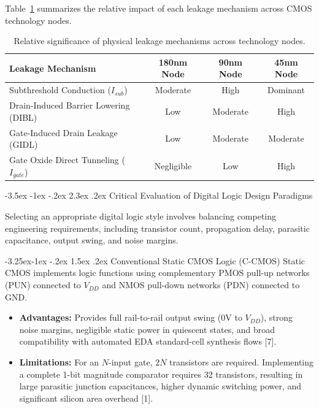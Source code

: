 \documentclass[12pt,a4paper,oneside]{report}
\makeatletter
\renewcommand\section{\@startsection {section}{1}{\z@}%
                                   {-3.5ex \@plus -1ex \@minus -.2ex}%
                                   {2.3ex \@plus.2ex}%
                                   {\normalfont\normalsize\bfseries}}
\renewcommand\subsection{\@startsection{subsection}{2}{\z@}%
                                     {-3.25ex\@plus -1ex \@minus -.2ex}%
                                     {1.5ex \@plus .2ex}%
                                     {\normalfont\normalsize\bfseries\itshape}}
\makeatother
\begin{document}
Table~\ref{tab:leakage_summary} summarizes the relative impact of each leakage mechanism across CMOS technology nodes.

\begin{table}[H]
\centering
\caption{Relative significance of physical leakage mechanisms across technology nodes.}
\label{tab:leakage_summary}
\vspace{0.2cm}
\begin{tabular}{|l|c|c|c|}
\hline
\textbf{Leakage Mechanism} & \textbf{180nm Node} & \textbf{90nm Node} & \textbf{45nm Node} \\
\hline
Subthreshold Conduction ($I_{sub}$) & Moderate & High & Dominant \\
\hline
Drain-Induced Barrier Lowering (DIBL) & Low & Moderate & High \\
\hline
Gate-Induced Drain Leakage (GIDL) & Low & Moderate & Moderate \\
\hline
Gate Oxide Direct Tunneling ($I_{gate}$) & Negligible & Low & High \\
\hline
\end{tabular}
\end{table}

\section{Critical Evaluation of Digital Logic Design Paradigms}

Selecting an appropriate digital logic style involves balancing competing engineering requirements, including transistor count, propagation delay, parasitic capacitance, output swing, and noise margins.

\subsection{Conventional Static CMOS Logic (C-CMOS)}
Static CMOS implements logic functions using complementary PMOS pull-up networks (PUN) connected to $V_{DD}$ and NMOS pull-down networks (PDN) connected to GND.
\begin{itemize}
\item \textbf{Advantages:} Provides full rail-to-rail output swing ($0\text{V}$ to $V_{DD}$), strong noise margins, negligible static power in quiescent states, and broad compatibility with automated EDA standard-cell synthesis flows [7].
\item \textbf{Limitations:} For an $N$-input gate, $2N$ transistors are required. Implementing a complete 1-bit magnitude comparator requires 32 transistors, resulting in large parasitic junction capacitances, higher dynamic switching power, and significant silicon area overhead [1].
\end{itemize}
\end{document}
